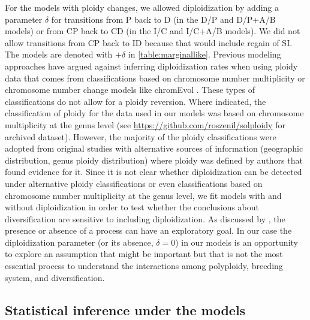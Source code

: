 For the models with ploidy changes, we allowed diploidization by adding a parameter $\delta$ for transitions from P back to D (in the D/P and D/P+A/B models) or from CP back to CD (in the I/C and I/C+A/B models).
We did not allow transitions from CP back to ID because that would include regain of SI.
The models are denoted with $+\delta$ in \cref{table:marginallike}.
Previous modeling approaches \citep{mayrose_2011} have argued against inferring diploidization rates when using ploidy data that comes from classifications based on chromosome number multiplicity or chromosome number change models like chromEvol \citep{mayrose_2010, glick2014, mayrose_2015, freyman_2017}.
These types of classifications do not allow for a ploidy reversion.
Where indicated, the classification of ploidy for the data used in our models was based on chromosome multiplicity at the genus level (see \url{https://github.com/roszenil/solploidy} for archived dataset). %
However, the majority of the ploidy classifications were adopted from original studies with alternative sources of information (\eg geographic distribution, genus ploidy distribution) where ploidy was defined by authors that found evidence for it.
Since it is not clear whether diploidization can be detected under alternative ploidy classifications or even classifications based on chromosome number multiplicity at the genus level, we fit models with and without diploidization in order to test  whether the conclusions about diversification are sensitive to including diploidization.
As discussed by \citet{servedio_2014}, the presence or absence of a process can have an exploratory goal.
In our case the diploidization parameter (or its absence, $\delta=0$) in our models is an opportunity to explore an assumption that might be important but that is not the most essential process to understand the interactions among polyploidy, breeding system, and diversification.

\subsection{Statistical inference under the models}

